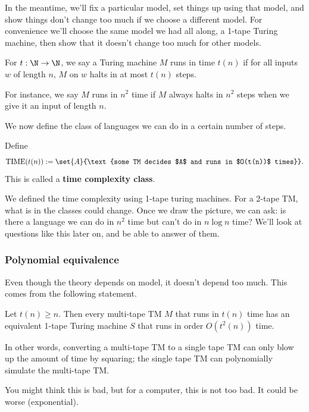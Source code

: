 In the meantime, we'll fix a particular model, set things up using that model, and show things don't change too much if we choose a different model. For convenience we'll choose the same model we had all along, a 1-tape Turing machine, then show that it doesn't change too much for other models.

\begin{df}
For $t:\N\to \N$, we say a Turing machine $M$ runs in time $t(n)$ if for all inputs $w$ of length $n$, $M$ on $w$ halts in at most $t(n)$ steps. 
\end{df}
For instance, we say $M$ runs in $n^2$ time if $M$ always halts in $n^2$ steps when we give it an input of length $n$.

We now define the class of languages we can do in a certain number of steps. 
\begin{df}
Define 
\[{\text{TIME}(t(n))}:=\set{A}{\text{some TM decides $A$ and runs in $O(t(n))$ times}}.\]
This is called a \textbf{time complexity class}.
\end{df}

We defined the time complexity using 1-tape turing machines. For a 2-tape TM, what is in the classes could change. 
Once we draw the picture, we can ask: is there a language we can do in $n^2$ time but can't do in $n\log n$ time? We'll look at questions like this later on, and be able to answer of them.

\subsubsection{Polynomial equivalence}
Even though the theory depends on model, it doesn't depend too much. %
This comes from the following statement.
\begin{thm}%
Let $t(n)\ge n$. Then every multi-tape TM $M$ that runs in $t(n)$ time has an equivalent 1-tape Turing machine $S$ that runs in order $O(t^2(n))$ time.
\end{thm}
In other words, converting a multi-tape TM to a single tape TM can only blow up the amount of time by squaring; the single tape TM can polynomially simulate the multi-tape TM.

You might think this is bad, but for a computer, this is not too bad. It could be worse (exponential).

